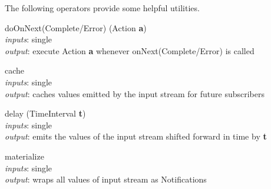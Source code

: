 \documentclass{dithesis}
\begin{document}
The following operators provide some helpful utilities.
\begin{description}

\begin{minipage}[c]{\lll}
\item[doOnNext(Complete/Error)] (Action \textbf{a})\\
	\textit{inputs}: single \\
	\textit{output}: execute Action \textbf{a} whenever onNext(Complete/Error) is called
\end{minipage}
\hfill
\newline \newline \newline
\begin{minipage}[c]{\lll}
\item[cache] ~\\
	\textit{inputs}: single \\
	\textit{output}: caches values emitted by the input stream for future subscribers
\end{minipage}
\hfill
\newline \newline \newline
\begin{minipage}[c]{\lll}
\item[delay] (TimeInterval \textbf{t})\\
	\textit{inputs}: single \\
	\textit{output}: emits the values of the input stream shifted forward in time by \textbf{t}
\end{minipage}
\hfill
\begin{minipage}[c]{\rrr}

\end{minipage}
\newline \newline \newline
\begin{minipage}[c]{\lll}
\item[materialize] ~\\
	\textit{inputs}: single \\
	\textit{output}: wraps all values of input stream as Notifications
\end{minipage}
\hfill
\begin{minipage}[c]{\rrr}

\end{minipage}
\newline \newline \newline

\end{description}
\end{document}

